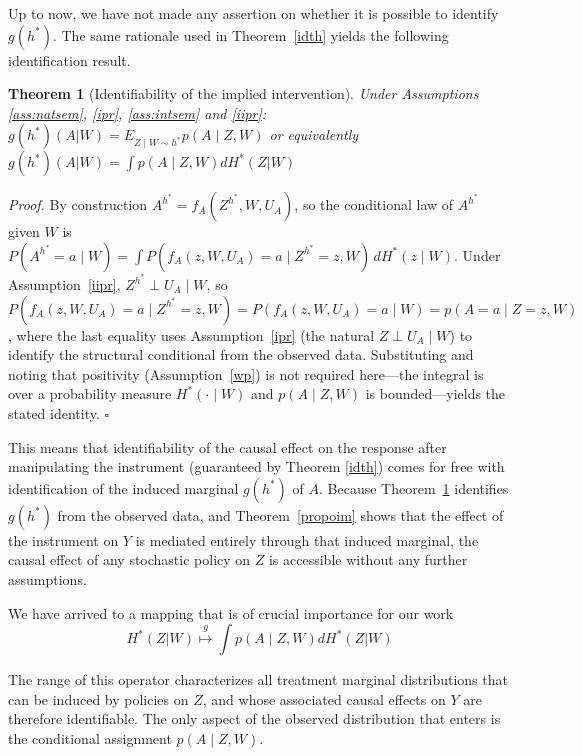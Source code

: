 \documentclass[12pt]{article}
\theoremstyle{thmstyleone}%
\newtheorem{theo}{Theorem}%
\theoremstyle{thmstyletwo}%
\theoremstyle{thmstylethree}%
\begin{document}
Up to now, we have not made any assertion on whether it is possible to identify $g(h^*)$.  {The same rationale used in Theorem~\ref{idth} yields the following identification result.}

\begin{theo}[Identifiability of the implied intervention]\label{idg}
Under Assumptions  \ref{ass:natsem}, \ref{ipr},  \ref{ass:intsem} and \ref{iipr}: $g(h^*)(A|W) =
E_{Z \mid W \sim h^*}
p(A \mid Z, W)$
or equivalently
$g(h^*)(A|W)  = \int   p(A \mid Z, W) dH^*(Z|W)$

\end{theo}

 {\textit{Proof.} By construction $A^{h^*} = f_A(Z^{h^*}, W, U_A)$, so the conditional law of $A^{h^*}$ given $W$ is
$P(A^{h^*}=a \mid W) = \int P(f_A(z,W,U_A) = a \mid Z^{h^*}=z, W)\, dH^*(z\mid W)$. Under Assumption~\ref{iipr}, $Z^{h^*} \perp U_A \mid W$, so $P(f_A(z,W,U_A)=a \mid Z^{h^*}=z, W) = P(f_A(z,W,U_A)=a \mid W) = p(A=a\mid Z=z, W)$, where the last equality uses Assumption~\ref{ipr} (the natural $Z \perp U_A \mid W$) to identify the structural conditional from the observed data. Substituting and noting that positivity (Assumption~\ref{wp}) is not required here---the integral is over a probability measure $H^*(\cdot\mid W)$ and $p(A\mid Z,W)$ is bounded---yields the stated identity. \hfill$\square$}



This means that identifiability of the causal effect on the response after manipulating the instrument (guaranteed by Theorem \ref{idth}) comes for free with identification of  {the induced marginal $g(h^*)$ of $A$}.  {Because Theorem~\ref{idg} identifies $g(h^*)$ from the observed data, and Theorem~\ref{propoim} shows that the effect of the instrument on $Y$ is mediated entirely through that induced marginal, the causal effect of any stochastic policy on $Z$ is accessible without any further assumptions.}

We have arrived to a mapping that is of crucial importance for our work \begin{equation}\label{main:operator} 
H^*(Z|W) \overset{g}{\longmapsto} \int   p(A \mid Z, W) dH^*(Z|W) \end{equation}

 {The range of this operator characterizes all treatment marginal distributions that can be induced by policies on $Z$, and whose associated causal effects on $Y$ are therefore identifiable. The only aspect of the observed distribution that enters is the conditional assignment $p(A\mid Z,W)$.}
\end{document}
